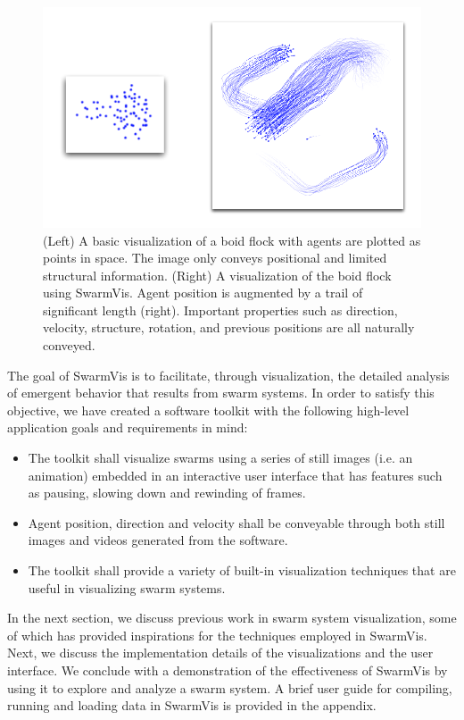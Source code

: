 \documentclass[conference]{IEEEtran}
\begin{document}
\begin{figure}[ht]
\centering
\includegraphics[scale=.55]{images/intro.pdf}
\caption{(Left) A basic visualization of a boid flock with agents are plotted as
points in space. The image only conveys positional and limited structural information.
(Right) A visualization of the boid flock using SwarmVis. Agent
position is augmented by a trail of significant length (right).
Important properties such as direction, velocity, structure, rotation,
and previous positions are all naturally conveyed.
}
\label{Intro}
\end{figure}

The goal of SwarmVis is to facilitate, through visualization, the detailed analysis of emergent behavior that results from swarm systems.
In order to satisfy this objective, we have created a software toolkit
with the following high-level application goals and requirements in mind:
\begin{itemize}
\item The toolkit shall visualize swarms using a series of still images (i.e. an animation)
embedded in an interactive user interface that has features such as pausing, slowing down and rewinding of frames.
\item Agent position, direction and velocity shall be conveyable through both still images and videos generated from the software.
\item The toolkit shall provide a variety of built-in visualization techniques that are useful in visualizing swarm systems.
\end{itemize}

In the next section, we discuss previous work in swarm system visualization,
some of which has provided inspirations for the techniques employed in SwarmVis.
Next, we discuss the implementation details of the visualizations and the user interface.
We conclude with a demonstration of the effectiveness of SwarmVis by using it to explore and analyze a swarm system.
A brief user guide for compiling, running and loading data in SwarmVis is provided in the appendix.
\end{document}
